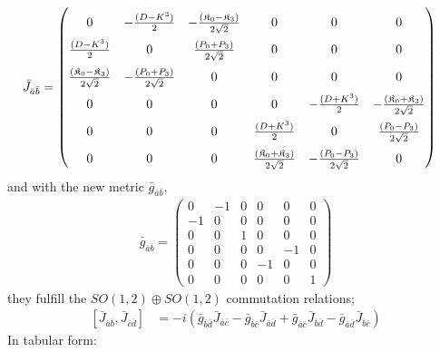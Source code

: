 \documentclass[]{article}
\numberwithin{equation}{section}
\begin{document}
{{  \begin{align}
     \bar{J}_{\bar{a}\bar{b}}&=\begin{pmatrix}
         \rule{0pt}{16pt} 0 & -\frac{(D-K^3)}{2} & -\frac{(\mathfrak{K}_{0}-\mathfrak{K}_{3})}{2\sqrt{2}}&0&0&0\\
         \rule{0pt}{16pt} \frac{(D-K^3)}{2}&0& \frac{(P_{0}+P_{3})}{2\sqrt{2}}&0&0&0\\
         \rule{0pt}{16pt} \frac{(\mathfrak{K}_{0}-\mathfrak{K}_{3})}{2\sqrt{2}}&-\frac{(P_{0}+P_{3})}{2\sqrt{2}}&0&0&0&0\\
         \rule{0pt}{16pt} 0&0&0&0 & -\frac{(D+K^3)}{2} & -\frac{(\mathfrak{K}_{0}+\mathfrak{K}_{3})}{2\sqrt{2}}\\
         \rule{0pt}{16pt}  0&0&0 &\frac{(D+K^3)}{2}&0& \frac{(P_{0}-P_{3})}{2\sqrt{2}}\\
          \rule{0pt}{16pt}  0&0&0 & \frac{(\mathfrak{K}_{0}+\mathfrak{K}_{3})}{2\sqrt{2}}&-\frac{(P_{0}-P_{3})}{2\sqrt{2}}&0
     \end{pmatrix}
 \end{align}
 and with the new metric $\bar{g}_{\bar{a}\bar{b}}$,
\begin{align}
    \bar{g}_{\bar{a}\bar{b}}= \begin{pmatrix}
            0&-1&0&0&0&0\\
            -1&0&0&0&0&0\\
            0&0&1&0&0&0\\
            0&0&0&0&-1&0\\
            0&0&0&-1&0&0\\
            0&0&0&0&0&1
            \end{pmatrix}
\end{align}
they fulfill the $SO(1,2)\oplus SO(1,2)$ commutation relations;
\begin{align}
      \left[\bar{J}_{\bar{a}\bar{b}},\bar{J}_{\bar{c}\bar{d}}\right]&=-i\left(\bar{g}_{\bar{b}\bar{d}}\bar{J}_{\bar{a}\bar{c}}-\bar{g}_{\bar{b}\bar{c}}\bar{J}_{\bar{a}\bar{d}}+\bar{g}_{\bar{a}\bar{c}}\bar{J}_{\bar{b}\bar{d}}-\bar{g}_{\bar{a}\bar{d}}\bar{J}_{\bar{b}\bar{c}}\right)
  \end{align}
In tabular form:
 \begin{table}[h!]
\centering
\caption{\label{tabelinterpolationlfd}$1+1$ conformal algebra in LFD}
\end{table}}}
\end{document}
